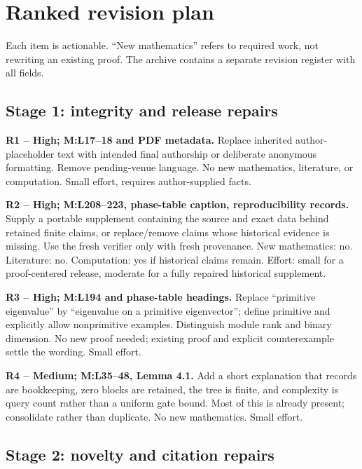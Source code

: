 \documentclass[
  11pt,
]{article}
\begin{document}
\section{Ranked revision plan}\label{ranked-revision-plan}

Each item is actionable. ``New mathematics'' refers to required work,
not rewriting an existing proof. The archive contains a separate
revision register with all fields.

\subsection{Stage 1: integrity and release
repairs}\label{stage-1-integrity-and-release-repairs}

\textbf{R1 -- High; M:L17--18 and PDF metadata.} Replace inherited
author-placeholder text with intended final authorship or deliberate
anonymous formatting. Remove pending-venue language. No new mathematics,
literature, or computation. Small effort, requires author-supplied
facts.

\textbf{R2 -- High; M:L208--223, phase-table caption, reproducibility
records.} Supply a portable supplement containing the source and exact
data behind retained finite claims, or replace/remove claims whose
historical evidence is missing. Use the fresh verifier only with fresh
provenance. New mathematics: no. Literature: no. Computation: yes if
historical claims remain. Effort: small for a proof-centered release,
moderate for a fully repaired historical supplement.

\textbf{R3 -- High; M:L194 and phase-table headings.} Replace
``primitive eigenvalue'' by ``eigenvalue on a primitive eigenvector'';
define primitive and explicitly allow nonprimitive examples. Distinguish
module rank and binary dimension. No new proof needed; existing proof
and explicit counterexample settle the wording. Small effort.

\textbf{R4 -- Medium; M:L35--48, Lemma 4.1.} Add a short explanation
that records are bookkeeping, zero blocks are retained, the tree is
finite, and complexity is query count rather than a uniform gate bound.
Most of this is already present; consolidate rather than duplicate. No
new mathematics. Small effort.

\subsection{Stage 2: novelty and citation
repairs}\label{stage-2-novelty-and-citation-repairs}
\end{document}
